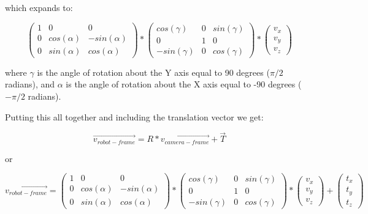 \documentclass[11pt]{article}
\begin{document}
which expands to:

\begin{equation}
    \begin{pmatrix}
        1 & 0 & 0 \\
        0 & cos(\alpha) & -sin(\alpha) \\
        0 & sin(\alpha) & cos(\alpha)
    \end{pmatrix}
    *
    \begin{pmatrix}
        cos(\gamma) & 0 & sin(\gamma) \\
        0 & 1 & 0 \\
        -sin(\gamma) & 0 & cos(\gamma)
    \end{pmatrix}
    * 
    \begin{pmatrix}
        v_x \\
        v_y \\
        v_z
    \end{pmatrix}
\end{equation}

where $\gamma$ is the angle of rotation about the Y axis equal to 90 degrees ($\pi/2$ radians), 
and $\alpha$ is the angle of rotation about the X axis equal to -90 degrees ($-\pi/2$ radians).

Putting this all together and including the translation vector we get:

\begin{equation}
    \vec{v_{robot-frame}} = R * \vec{v_{camera-frame}} + \vec{T}
\end{equation}

or

\begin{equation}
    \vec{v_{robot-frame}} = 
    \begin{pmatrix}
        1 & 0 & 0 \\
        0 & cos(\alpha) & -sin(\alpha) \\
        0 & sin(\alpha) & cos(\alpha)
    \end{pmatrix}
    *
    \begin{pmatrix}
        cos(\gamma) & 0 & sin(\gamma) \\
        0 & 1 & 0 \\
        -sin(\gamma) & 0 & cos(\gamma)
    \end{pmatrix}
    * 
    \begin{pmatrix}
        v_x \\
        v_y \\
        v_z
    \end{pmatrix}
    +
    \begin{pmatrix}
        t_x \\
        t_y \\        
        t_z
    \end{pmatrix}
\end{equation}
\end{document}
